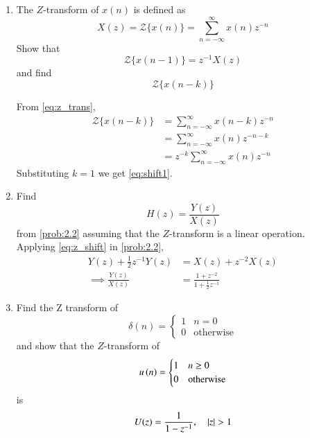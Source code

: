 \documentclass[journal,12pt,twocolumn]{IEEEtran}
\theoremstyle{remark}
\begin{document}
\begin{enumerate}[label=\thesection.\arabic*]
\item The $Z$-transform of $x(n)$ is defined as
%
\begin{equation}
\label{eq:z_trans}
X(z)={\mathcal {Z}}\{x(n)\}=\sum _{n=-\infty }^{\infty }x(n)z^{-n}
\end{equation}
%
Show that
\begin{equation}
\label{eq:shift1}
{\mathcal {Z}}\{x(n-1)\} = z^{-1}X(z)
\end{equation}
and find
\begin{equation}
	{\mathcal {Z}}\{x(n-k)\} 
\end{equation}

\solution From \eqref{eq:z_trans},
\begin{align}
{\mathcal {Z}}\{x(n-k)\} &=\sum _{n=-\infty }^{\infty }x(n-k)z^{-n}
\\
&=\sum _{n=-\infty }^{\infty }x(n)z^{-n-k} \\
&= z^{-k}\sum _{n=-\infty }^{\infty }x(n)z^{-n} \label{eq:z_shift}
\end{align}
Substituting $k = 1$ we get \eqref{eq:shift1}. 

\item Find
%
\begin{equation}
H(z) = \frac{Y(z)}{X(z)}
\end{equation}
from  \eqref{prob:2.2} assuming that the $Z$-transform is a linear operation.\\
\solution  Applying \eqref{eq:z_shift} in \eqref{prob:2.2},
\begin{align}
Y(z) + \frac{1}{2}z^{-1}Y(z) &= X(z)+z^{-2}X(z)\\
\implies \frac{Y(z)}{X(z)} &= \frac{1 + z^{-2}}{1 + \frac{1}{2}z^{-1}}
\label{eq:freq_resp}
\end{align}

\item Find the Z transform of 
\begin{equation}
    \delta(n) =
    \begin{cases}
        1 & n = 0\\
        0 & \text{otherwise}
    \end{cases}
\end{equation}
and show that the $Z$-transform of
\begin{equation}
\label{eq:unit_step}
u\left(n\right) =
    \begin{cases}
    1 & n \ge 0\\
    0 & \text{otherwise}
    \end{cases}
\end{equation}
is
\begin{equation}
    U(z) = \frac{1}{1-z^{-1}}, \quad \left\vert z\right\vert > 1
\end{equation}


\end{enumerate}
\end{document}
